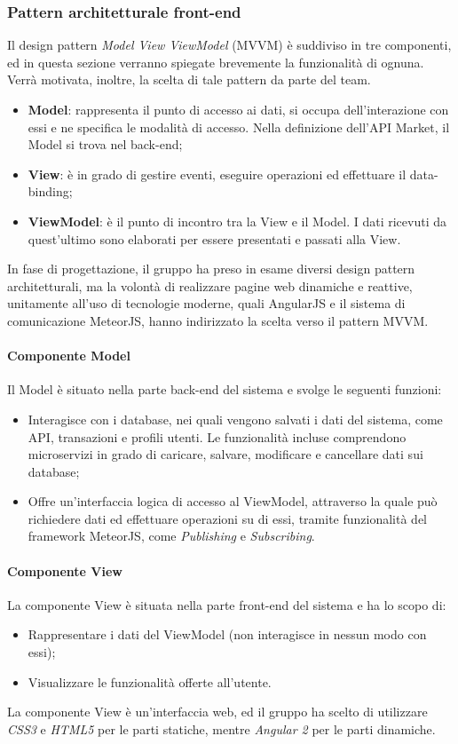 \subsubsection{Pattern architetturale front-end}
Il design pattern \textit{Model View ViewModel} (MVVM) è suddiviso in tre componenti, ed in questa sezione verranno spiegate brevemente la funzionalità di ognuna. Verrà motivata, inoltre, la scelta di tale pattern da parte del team.

\begin{itemize}
	\item \textbf{Model}: rappresenta il punto di accesso ai dati, si occupa dell'interazione con essi e ne specifica le modalità di accesso. Nella definizione dell'API Market, il Model si trova nel back-end;
	\item \textbf{View}: è in grado di gestire eventi, eseguire operazioni ed effettuare il data-binding;
	\item \textbf{ViewModel}: è il punto di incontro tra la View e il Model. I dati ricevuti da quest’ultimo sono elaborati per essere presentati e passati alla View.
\end{itemize}

In fase di progettazione, il gruppo ha preso in esame diversi design pattern architetturali, ma la volontà di realizzare pagine web dinamiche e reattive, unitamente all'uso di tecnologie moderne, quali AngularJS e il sistema di comunicazione MeteorJS, hanno indirizzato la scelta verso il pattern MVVM.

\paragraph{Componente Model}
Il Model è situato nella parte back-end del sistema e svolge le seguenti funzioni:
\begin{itemize}
	\item Interagisce con i database, nei quali vengono salvati i dati del sistema, come API, transazioni e profili utenti. Le funzionalità incluse comprendono microservizi in grado di caricare, salvare, modificare e cancellare dati sui database;
	\item Offre un'interfaccia logica di accesso al ViewModel, attraverso la quale può richiedere dati ed effettuare operazioni su di essi, tramite funzionalità del framework MeteorJS, come \textit{Publishing} e \textit{Subscribing}.
\end{itemize}

\paragraph{Componente View}
La componente View è situata nella parte front-end del sistema e ha lo scopo di:
\begin{itemize}
	\item Rappresentare i dati del ViewModel (non interagisce in nessun modo con essi);
	\item Visualizzare le funzionalità offerte all'utente.
\end{itemize} 
La componente View è un'interfaccia web, ed il gruppo ha scelto di utilizzare \textit{CSS3} e \textit{HTML5} per le parti statiche, mentre \textit{Angular 2} per le parti dinamiche. 

